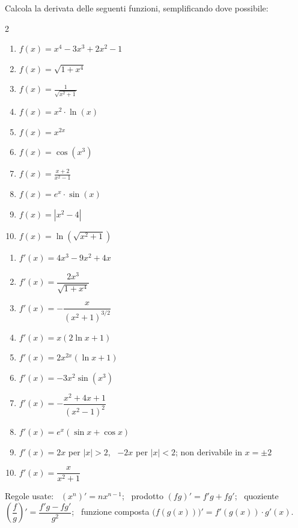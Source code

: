\begin{question}[ID=1.2, subtitle={Calcolo di derivate — serie 2}, tags={derivate, calcolo}, difficulty=media]
Calcola la derivata delle seguenti funzioni, semplificando dove possibile:
\begin{center}\begin{minipage}{0.92\linewidth}
\begin{multicols}{2}
\begin{enumerate}[label=\arabic*),leftmargin=3.2cm]
\item $f(x) = x^4 - 3x^3 + 2x^2 - 1$
\item $f(x) = \sqrt{1 + x^4}$
\item $f(x) = \frac{1}{\sqrt{x^2 + 1}}$
\item $f(x) = x^2 \cdot \ln(x)$
\item $f(x) = x^{2x}$
\item $f(x) = \cos(x^3)$
\item $f(x) = \frac{x+2}{x^2 - 1}$
\item $f(x) = e^x \cdot \sin(x)$
\item $f(x) = |x^2 - 4|$
\item $f(x) = \ln(\sqrt{x^2 + 1})$
\end{enumerate}
\end{multicols}
\end{minipage}\end{center}
\begin{solution}
\begin{enumerate}[label=\arabic*)]
    \item $f'(x)=4x^3-9x^2+4x$
    \item $f'(x)=\dfrac{2x^3}{\sqrt{1+x^4}}$
    \item $f'(x)=-\dfrac{x}{(x^2+1)^{3/2}}$
    \item $f'(x)=x(2\ln x+1)$
    \item $f'(x)=2x^{2x}(\ln x+1)$
    \item $f'(x)=-3x^2\sin(x^3)$
    \item $f'(x)=-\dfrac{x^2+4x+1}{(x^2-1)^2}$
    \item $f'(x)=e^x(\sin x+\cos x)$
    \item $f'(x)=2x$ per $|x|>2$, \ $-2x$ per $|x|<2$; non derivabile in $x=\pm2$
    \item $f'(x)=\dfrac{x}{x^2+1}$
\end{enumerate}
\end{solution}
\begin{explanation}
Regole usate: \ $(x^n)'=nx^{n-1}$; \ prodotto $(fg)'=f'g+fg'$; \ quoziente $\left(\dfrac fg\right)'=\dfrac{f'g-fg'}{g^2}$; \ funzione composta $\big(f(g(x))\big)'=f'(g(x))\cdot g'(x)$.

\end{explanation}
\end{question}
